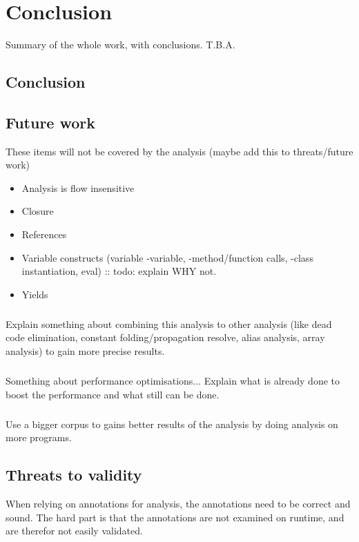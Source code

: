 \documentclass[main.tex]{subfiles}
\begin{document}
    \chapter{Conclusion}\label{ch:conclusion}
    Summary of the whole work, with conclusions. T.B.A.
    
    \section{Conclusion}
    
    \section{Future work}
    These items will not be covered by the analysis (maybe add this to threats/future work)
    \begin{itemize}
        \item Analysis is flow insensitive
        \item Closure
        \item References
        \item Variable constructs (variable -variable, -method/function calls, -class instantiation, eval) :: todo: explain WHY not.
        \item Yields
    \end{itemize}

    
    \paragraph{}
    Explain something about combining this analysis to other analysis (like dead code elimination, constant folding/propagation resolve, alias analysis, array analysis) to gain more precise results.
    
    \paragraph{}
    Something about performance optimisations... Explain what is already done to boost the performance and what still can be done.
        
    \paragraph{}
    Use a bigger corpus to gains better results of the analysis by doing analysis on more programs.
    
    \section{Threats to validity}
    When relying on annotations for analysis, the annotations need to be correct and sound.
    The hard part is that the annotations are not examined on runtime, and are therefor not easily validated.
\end{document}
